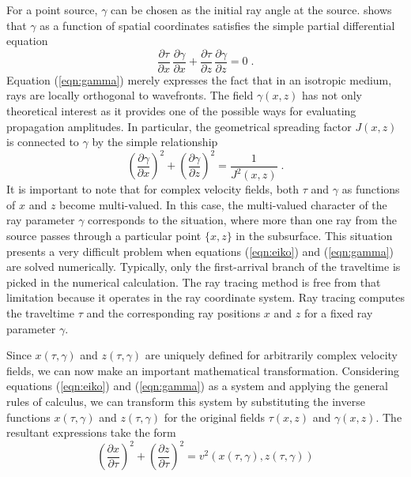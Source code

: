 For a point source, $\gamma$ can be chosen as the initial ray angle at
the source.   shows that $\gamma$ as a
function of spatial coordinates satisfies the simple partial
differential equation
\begin{equation}
  \label{eqn:gamma}
  \frac{\partial \tau}{\partial x}\,\frac{\partial \gamma}{\partial x}  +
  \frac{\partial \tau}{\partial z}\,\frac{\partial \gamma}{\partial z} = 0\;.
\end{equation}
Equation (\ref{eqn:gamma}) merely expresses the fact that in an
isotropic medium, rays are locally orthogonal to wavefronts. The field
$\gamma (x,z)$ has not only theoretical interest as it provides one of
the possible ways for evaluating propagation amplitudes. In particular,
the geometrical spreading factor $J (x,z)$ is connected to $\gamma$ by
the simple relationship \cite{Zhang.sepphd.76}
\begin{equation}
  \label{eqn:spread}
  \left(\frac{\partial \gamma}{\partial x}\right)^2 +
  \left(\frac{\partial \gamma}{\partial z}\right)^2 =
  \frac{1}{J^2(x,z)}\;.
\end{equation}
It is important to note that for complex velocity fields, both $\tau$
and $\gamma$ as functions of $x$ and $z$ become multi-valued. In this
case, the multi-valued character of the ray parameter $\gamma$
corresponds to the situation, where more than one ray from the source
passes through a particular point $\{x,z\}$ in the subsurface. This
situation presents a very difficult problem when equations
(\ref{eqn:eiko}) and (\ref{eqn:gamma}) are solved numerically.
Typically, only the first-arrival branch of the traveltime is picked
in the numerical calculation. The ray tracing method is free from that
limitation because it operates in the ray coordinate system. Ray
tracing computes the traveltime $\tau$ and the corresponding ray
positions $x$ and $z$ for a fixed ray parameter $\gamma$.
\par
Since $x (\tau,\gamma)$ and $z (\tau, \gamma)$ are uniquely defined for
arbitrarily complex velocity fields, we can now make an important
mathematical transformation. Considering equations (\ref{eqn:eiko}) and
(\ref{eqn:gamma}) as a system and applying the general rules of calculus,
we can transform this system by substituting the inverse functions 
$x (\tau,\gamma)$ and $z (\tau, \gamma)$ for the original fields
$\tau (x,z)$ and $\gamma (x,z)$. The resultant expressions take the form
\begin{equation}
  \label{eqn:one}
  \left(\frac{\partial x}{\partial \tau}\right)^2 +
  \left(\frac{\partial z}{\partial \tau}\right)^2  =  
  v^2 \left(x(\tau,\gamma),z(\tau,\gamma)\right)
\end{equation}
